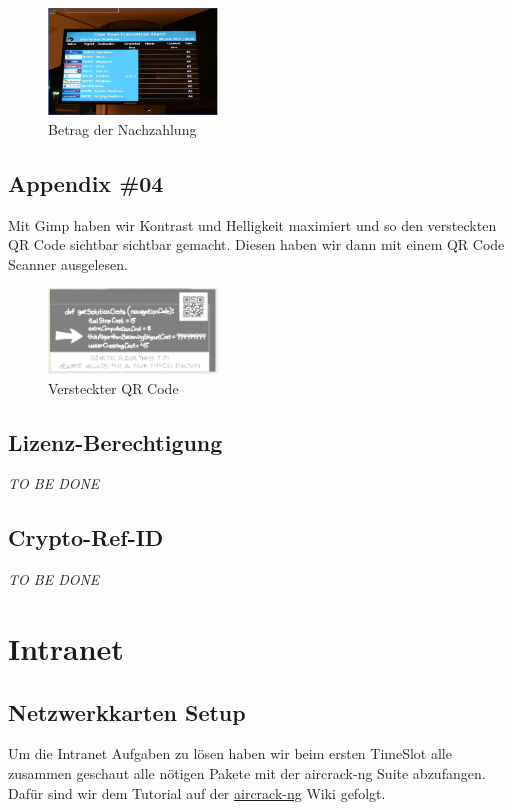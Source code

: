 \documentclass[12pt,a4paper,titlepage,oneside]{scrartcl}
\begin{document}
\begin{figure}[h!]
  \centering
    \includegraphics[width=0.4\textwidth]{./imgs/Forensik/versteckte_flugzeit.png}
  \caption{Betrag der Nachzahlung}
  \label{fig:allvoipcalls}
\end{figure}

\pagebreak
\subsection{Appendix \#04}
Mit Gimp haben wir Kontrast und Helligkeit maximiert und so den versteckten QR Code sichtbar sichtbar gemacht.
Diesen haben wir dann mit einem QR Code Scanner ausgelesen.


\begin{figure}[h!]
  \centering
    \includegraphics[width=0.4\textwidth]{./imgs/Forensik/hidden_qr.png}
  \caption{Versteckter QR Code}
  \label{fig:allvoipcalls}
\end{figure}

\pagebreak
\subsection{Lizenz-Berechtigung}
\emph{TO BE DONE}

\subsection{Crypto-Ref-ID}
\emph{TO BE DONE}

\section{Intranet}

\subsection{Netzwerkkarten Setup}
Um die Intranet Aufgaben zu lösen haben wir beim ersten TimeSlot alle zusammen geschaut alle nötigen Pakete mit der aircrack-ng Suite abzufangen. Dafür sind wir dem Tutorial auf der \href{https://www.aircrack-ng.org/doku.php?id=cracking_wpa}{aircrack-ng} Wiki gefolgt.
\end{document}
